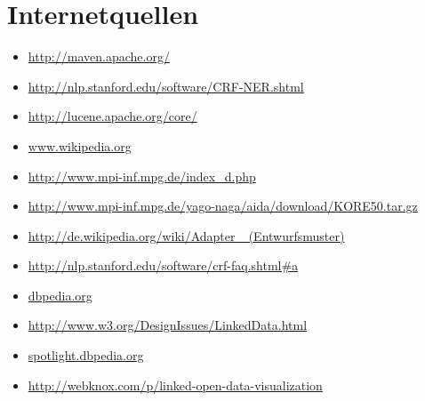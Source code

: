 \documentclass[11pt, a4paper, oneside]{Thesis} %
\begin{document}

\section*{Internetquellen}
\begin{itemize}
\item \url{http://maven.apache.org/}
\item \url{http://nlp.stanford.edu/software/CRF-NER.shtml}
\item \url{http://lucene.apache.org/core/}
\item \url{www.wikipedia.org}
\item \url{http://www.mpi-inf.mpg.de/index\_d.php}
\item \url{http://www.mpi-inf.mpg.de/yago-naga/aida/download/KORE50.tar.gz}
\item \url{http://de.wikipedia.org/wiki/Adapter
\_(Entwurfsmuster)}
\item \url{http://nlp.stanford.edu/software/crf-faq.shtml\#a}
\item \url{dbpedia.org}
\item \url{http://www.w3.org/DesignIssues/LinkedData.html}
\item \url{spotlight.dbpedia.org}
\item \url{http://webknox.com/p/linked-open-data-visualization}
\end{itemize}
\end{document}

